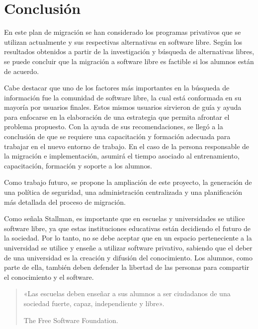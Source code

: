 \chapter{Conclusión}\label{ch:Conclusión}

En este plan de migración se han considerado los programas privativos que se utilizan actualmente y sus respectivas alternativas en software libre. Según los resultados obtenidos a partir de la investigación y búsqueda de alternativas libres, se puede concluir que la migración a software libre es factible si los alumnos están de acuerdo.\par

Cabe destacar que uno de los factores más importantes en la búsqueda de información fue la comunidad de software libre, la cual está conformada en su mayoría por usuarios finales. Estos mismos usuarios sirvieron de guía y ayuda para enfocarse en la elaboración de una estrategia que permita afrontar el problema propuesto. Con la ayuda de sus recomendaciones, se llegó a la conclusión de que se requiere una capacitación y formación adecuada para trabajar en el nuevo entorno de trabajo. En el caso de la persona responsable de la migración e implementación, asumirá el tiempo asociado al entrenamiento, capacitación, formación y soporte a los alumnos.\par

Como trabajo futuro, se propone la ampliación de este proyecto, la generación de una política de seguridad, una administración centralizada y una planificación más detallada del proceso de migración.

Como señala Stallman, es importante que en escuelas y universidades se utilice software libre, ya que estas instituciones educativas están decidiendo el futuro de la sociedad. Por lo tanto, no se debe aceptar que en un espacio perteneciente a la universidad se utilice y enseñe a utilizar software privativo, sabiendo que el deber de una universidad es la creación y difusión del conocimiento. Los alumnos, como parte de ella, también deben defender la libertad de  las personas para compartir el conocimiento y el software.	

	
	\vspace{0.3cm}
	
	\begin{quote}
		
		\begin{flushright}
			
		{\small	«Las escuelas deben enseñar a sus alumnos a ser ciudadanos de una sociedad fuerte, capaz, independiente y libre».\par
		
		The Free Software Foundation.}
		
	\end{flushright}

		
	\end{quote}
	